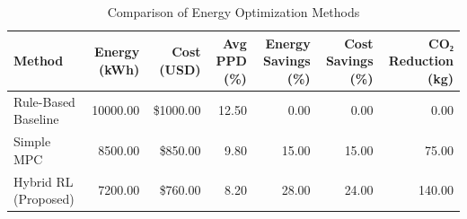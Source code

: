 \begin{table}
\centering
\caption{Comparison of Energy Optimization Methods}
\label{tab:method_comparison}
\begin{tabular}{lrrrrrr}
\toprule
Method & Energy (kWh) & Cost (USD) & Avg PPD (\%) & Energy Savings (\%) & Cost Savings (\%) & CO₂ Reduction (kg) \\
\midrule
Rule-Based Baseline & 10000.00 & \$1000.00 & 12.50 & 0.00 & 0.00 & 0.00 \\
Simple MPC & 8500.00 & \$850.00 & 9.80 & 15.00 & 15.00 & 75.00 \\
Hybrid RL (Proposed) & 7200.00 & \$760.00 & 8.20 & 28.00 & 24.00 & 140.00 \\
\bottomrule
\end{tabular}
\end{table}
